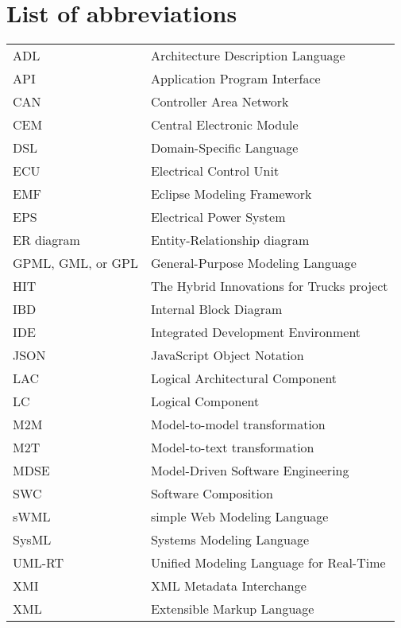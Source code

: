 
\thispagestyle{plain}			%

\section*{List of abbreviations}

\begin{table}[H]
\begin{tabular}{ll}
ADL & Architecture Description Language \\
API & Application Program Interface \\
CAN & Controller Area Network \\
CEM & Central Electronic Module \\
DSL & Domain-Specific Language \\
ECU & Electrical Control Unit \\
EMF & Eclipse Modeling Framework \\
EPS & Electrical Power System \\
ER diagram & Entity-Relationship diagram \\
GPML, GML, or GPL & General-Purpose Modeling Language \\
HIT & The Hybrid Innovations for Trucks project \\
IBD & Internal Block Diagram \\
IDE & Integrated Development Environment \\
JSON & JavaScript Object Notation \\
LAC & Logical Architectural Component \\
LC & Logical Component \\
M2M & Model-to-model transformation \\
M2T & Model-to-text transformation \\
MDSE & Model-Driven Software Engineering \\
SWC & Software Composition \\
sWML & simple Web Modeling Language \\
SysML & Systems Modeling Language \\
UML-RT &  Unified Modeling Language for Real-Time \\
XMI & XML Metadata Interchange \\
XML & Extensible Markup Language \\
\end{tabular}
\end{table}

